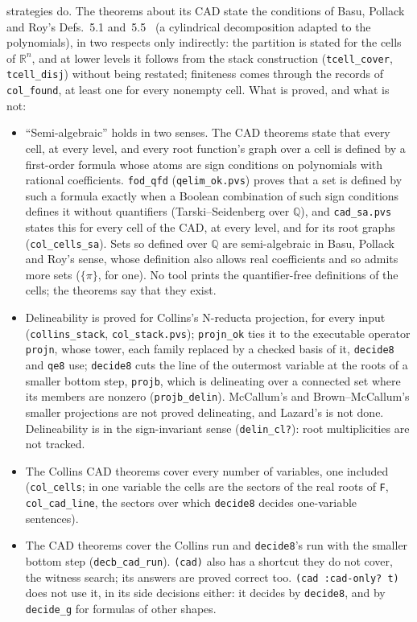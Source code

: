 \documentclass[11pt]{article}
\begin{document}
strategies do. The theorems about its CAD state the conditions
of Basu, Pollack and Roy's Defs.~5.1 and~5.5~\cite{bpr} (a cylindrical decomposition adapted to the polynomials), in
two respects only indirectly: the partition is stated for the cells of
$\mathbb{R}^n$, and at lower levels it follows from the stack construction (\texttt{tcell\_cover}, \texttt{tcell\_disj})
without being restated; finiteness comes through the records of \texttt{col\_found}, at least one
for every nonempty cell. What is proved, and what is not:
\begin{itemize}[leftmargin=1.3em, itemsep=1pt, topsep=2pt]
\item ``Semi-algebraic'' holds in two senses. The CAD theorems state that every cell, at every level, and every root
function's graph over a cell is defined by a first-order formula whose atoms are sign conditions on polynomials with
rational coefficients. \texttt{fod\_qfd} (\texttt{qelim\_ok.pvs}) proves that a set is defined by such a formula exactly
when a Boolean combination of such sign conditions defines it without quantifiers (Tarski--Seidenberg over
$\mathbb{Q}$), and \texttt{cad\_sa.pvs} states this for every cell of the CAD, at every level, and for its root
graphs (\texttt{col\_cells\_sa}). Sets so defined over $\mathbb{Q}$ are
semi-algebraic in Basu, Pollack and Roy's sense, whose definition also allows real coefficients and so admits more sets
($\{\pi\}$, for one). No tool prints the quantifier-free definitions of the cells; the theorems say that they exist.
\item Delineability is proved for Collins's N-reducta projection, for every input (\texttt{collins\_stack}, \texttt{col\_stack.pvs});
\texttt{projn\_ok} ties it to the executable operator \texttt{projn}, whose tower, each family replaced by a checked
basis of it, \texttt{decide8} and \texttt{qe8} use; \texttt{decide8} cuts the line of the outermost variable at the
roots of a smaller bottom step, \texttt{projb}, which is delineating over a connected set where its members are nonzero
(\texttt{projb\_delin}).
McCallum's and Brown--McCallum's smaller projections are not proved delineating, and Lazard's is
not done. Delineability is in the sign-invariant sense (\texttt{delin\_cl?}): root multiplicities are not tracked.
\item The Collins CAD theorems cover every number of variables, one included (\texttt{col\_cells}; in one variable the
cells are the sectors of the real roots of \texttt{F}, \texttt{col\_cad\_line}, the sectors over which
\texttt{decide8} decides one-variable sentences).
\item The CAD theorems cover the Collins run and \texttt{decide8}'s run with the smaller bottom
step (\texttt{decb\_cad\_run}). \texttt{(cad)} also has a shortcut they do not cover, the witness search; its answers
are proved correct too.
\texttt{(cad :cad-only? t)} does not use it, in its side decisions either: it decides by \texttt{decide8}, and by
\texttt{decide\_g} for formulas of other shapes.
\end{itemize}
\end{document}
